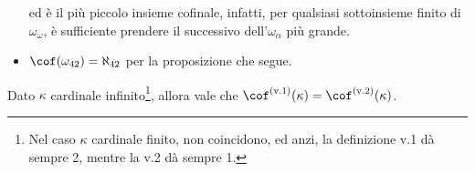 \documentclass[11pt]{scrartcl}
\begin{document}
\begin{example}
\begin{itemize}
		ed è il più piccolo insieme cofinale, infatti, per qualsiasi sottoinsieme finito di $\omega_\omega$, è sufficiente prendere il successivo dell'$\omega_\alpha$ più grande.
		\item $\cof(\omega_{42}) = \aleph_{42}$ per la proposizione che segue.
	\end{itemize}
\end{example}

\begin{proposition}
	Dato $\kappa$ cardinale infinito\footnote{Nel caso $\kappa$ cardinale finito, non coincidono, ed anzi, la definizione v.1 dà sempre 2, mentre la v.2 dà sempre 1.},
	allora vale che $\cof^{\text{(v.1)}}(\kappa) = \cof^{\text{(v.2)}}(\kappa)$.
\end{proposition}
\end{document}
